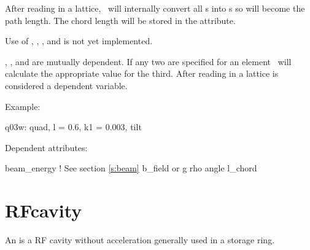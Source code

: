 After reading in a lattice, \bmad\ will internally convert all s
into s so  will become the path length. The chord length will
be stored in the  attribute.

Use of , , , and  is not yet implemented.

, , and  are mutually dependent. If any two are specified
for an element \bmad\ will calculate the appropriate value for the third.
After reading in a lattice  is considered a dependent variable.

\vskip0.05in \noindent
Example:
\begin{example}
  q03w: quad, l = 0.6, k1 = 0.003, tilt
\end{example}

\vskip0.05in \noindent
Dependent attributes:
\begin{example}
  beam\_energy  ! See section \ref{s:beam}
  b\_field or g
  rho
  angle
  l\_chord
\end{example}

\section{RFcavity}
\label{s:rfcav}

An  is a RF cavity without acceleration generally used in a storage ring.


